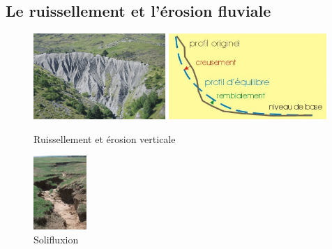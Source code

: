 \documentclass{beamer}
\begin{document}
\subsection{Le ruissellement et l'érosion fluviale}
\begin{frame}
  \begin{figure}
    \includegraphics[width=5cm]{Images/Diapos/Erosion/Fluviale/bad_lands.jpg}
    \includegraphics[width=6cm]{Images/Diapos/Erosion/Fluviale/n_base.jpg}
    \caption{Ruissellement et érosion verticale}
  \end{figure}
  \begin{center}
    \begin{figure}
      \includegraphics[width=2cm]{Images/Diapos/Erosion/Fluviale/solixfluxion.jpg}
      \caption{Solifluxion}
    \end{figure}
  \end{center}
\end{frame}
\end{document}
